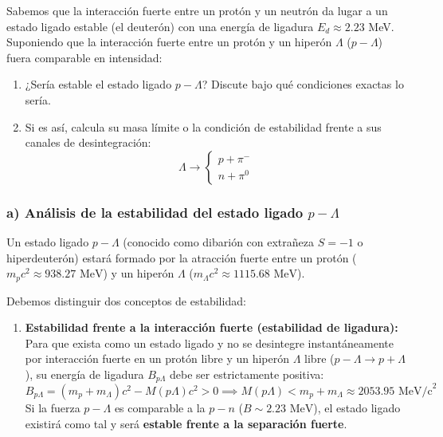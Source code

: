 \begin{problema}
Sabemos que la interacción fuerte entre un protón y un neutrón da lugar a un estado ligado estable (el deuterón) con una energía de ligadura $E_{d}\approx2.23$ MeV. Suponiendo que la interacción fuerte entre un protón y un hiperón $\Lambda$ ($p-\Lambda$) fuera comparable en intensidad:
\begin{enumerate}[label=\alph*.-]
    \item ¿Sería estable el estado ligado $p-\Lambda$? Discute bajo qué condiciones exactas lo sería.
    \item Si es así, calcula su masa límite o la condición de estabilidad frente a sus canales de desintegración:
    \begin{equation*}
    \Lambda \rightarrow \begin{cases} p + \pi^- \\ n + \pi^0 \end{cases}
    \end{equation*}
\end{enumerate}

\tcblower

\subsubsection*{a) Análisis de la estabilidad del estado ligado $p-\Lambda$}

Un estado ligado $p-\Lambda$ (conocido como dibarión con extrañeza $S=-1$ o hiperdeuterón) estará formado por la atracción fuerte entre un protón ($m_p c^2 \approx 938.27\text{ MeV}$) y un hiperón $\Lambda$ ($m_\Lambda c^2 \approx 1115.68\text{ MeV}$).

Debemos distinguir dos conceptos de estabilidad:

\begin{enumerate}[label=\arabic*.]
    \item \textbf{Estabilidad frente a la interacción fuerte (estabilidad de ligadura):}
    Para que exista como un estado ligado y no se desintegre instantáneamente por interacción fuerte en un protón libre y un hiperón $\Lambda$ libre ($p-\Lambda \to p + \Lambda$), su energía de ligadura $B_{p\Lambda}$ debe ser estrictamente positiva:
    \begin{equation*}
    B_{p\Lambda} = (m_p + m_\Lambda)c^2 - M(p\Lambda)c^2 > 0 \implies M(p\Lambda) < m_p + m_\Lambda \approx 2053.95\text{ MeV/c}^2
    \end{equation*}
    Si la fuerza $p-\Lambda$ es comparable a la $p-n$ ($B \sim 2.23\text{ MeV}$), el estado ligado existirá como tal y será \textbf{estable frente a la separación fuerte}.


\end{enumerate}
\end{problema}
